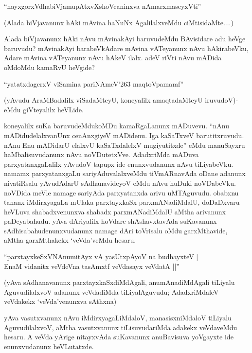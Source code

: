 \begin{shloka}
``nayxgorxVdhabiVjamupAtxvXshoVcaninxva nAmarxmaseyxVti''
\end{shloka}

(Alada biVjavanunx hAki mAvina haNuNx AgalilalxveMdu ciMtisidaMte....)

Alada biVjavanunx hAki nAvu mAvinakAyi baruvudeMdu BAvisidare adu heVge baruvudu? mAvinakAyi barabeVkAdare mAvina vATeyanunx nAvu hAkirabeVku, Adare mAvina vATeyanunx nAvu hAkeV ilalx. adeV riVti nAvu mADida oMdoMdu kamaRvU heVgide?

\begin{shloka}
``yatatxdagerxV viSamina pariNAmeV\char'263 maqtoVpamamf''
\end{shloka}

(yAvudu AraMBadalilx viSadaMteyU, koneyalilx amaqtadaMteyU iruvudoV)-eMdu giVteyalilx heVLide.

koneyalilx suKa baruvudeMdukoMDu kamaRgaLanunx mADuvevu. ``nAnu mADidudelalxvanUnx cenAnxgiyeV mADidenu. Iga kaSaTxveV barutitxruvudu. nAnu Enu mADidarU elalxvU kaSaTxdalelxV mugiyutitxde'' eMdu manuSayxru haMbalisuvudanunx nAvu noVDutetxVve. AdadxriMda mADuva parxyatanxgaLalilx yAvudoV tapupx ide enunxvudanunx nAvu tiLiyabeVku. namamx parxyatanxgaLu sariyAduvalalxveMdu tiVmARnavAda oDane adanunx nivatiRsalu yAvudAdarU sAdhanavideyoV eMdu nAvu huDuki noVDabeVku. noVDida meVle namage sariyAda parxyatanxda arivu uMTAguvudu. obabxnu tananx iMdirxyagaLa mUlaka parxtayxkaSx parxmANadiMdalU, doDaDxvaru heVLuva shabadxvenunxva shabadx parxmANadiMdalU aMtha arivanunx paDeyabahudu. yAva dAriyalilx hoVdare shAshavxtavAda suKavanunx sAdhisabahudenunxvudanunx namage dAri toVrisalu oMdu garxMthavide, aMtha garxMthakekx `veVda'veMdu hesaru.

\begin{shloka}
``parxtayxkeSxVNAnumitAyx vA yasUtxpAyoV na budhayxteV |\\
EnaM vidanitx veVdeVna tasAmxtf veVdasayx veVdatA ||''
\end{shloka}

(yAva sAdhanavanunx parxtayxkaSxdiMdAgali, anumAnadiMdAgali tiLiyalu AguvudilalxvoV adanunx veVdadiMda tiLiyalAguvudu; AdadxriMdaleV veVdakekx `veVda'venunxva sAthxna)

yAva vasutxvanunx nAvu iMdirxyagaLiMdaloV, manasisxniMdaloV tiLiyalu AguvudilalxvoV, aMtha vasutxvanunx tiLisuvudariMda adakekx veVdaveMdu hesaru. A veVda yArige nitayxvAda suKavanunx anuBavisuva yoVgayxte ide enunxvudanunx heVLutatxde.

